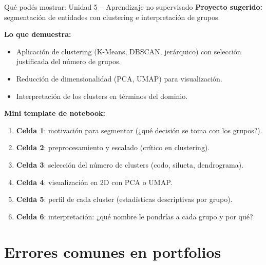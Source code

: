 \documentclass[aspectratio=169]{beamer}
\begin{document}
\begin{frame}{Qué podés mostrar: Unidad 5 -- Aprendizaje no supervisado}
  \textbf{Proyecto sugerido:} segmentación de entidades con clustering e interpretación de grupos.

  \bigskip
  \textbf{Lo que demuestra:}
  \begin{itemize}
    \item Aplicación de clustering (K-Means, DBSCAN, jerárquico) con selección justificada del número de grupos.
    \item Reducción de dimensionalidad (PCA, UMAP) para visualización.
    \item Interpretación de los clusters en términos del dominio.
  \end{itemize}

  \bigskip
  \textbf{Mini template de notebook:}
  \begin{enumerate}
    \item \textbf{Celda 1}: motivación para segmentar (¿qué decisión se toma con los grupos?).
    \item \textbf{Celda 2}: preprocesamiento y escalado (crítico en clustering).
    \item \textbf{Celda 3}: selección del número de clusters (codo, silueta, dendrograma).
    \item \textbf{Celda 4}: visualización en 2D con PCA o UMAP.
    \item \textbf{Celda 5}: perfil de cada cluster (estadísticas descriptivas por grupo).
    \item \textbf{Celda 6}: interpretación: ¿qué nombre le pondrías a cada grupo y por qué?
  \end{enumerate}
\end{frame}

\section{Errores comunes en portfolios}
\end{document}
